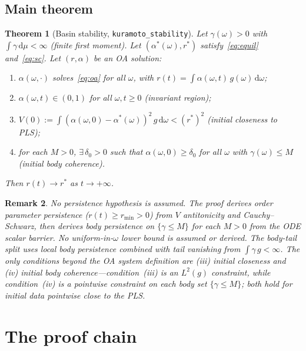 \documentclass[11pt,a4paper]{article}
\newtheorem{theorem}{Theorem}[section]
\newtheorem{remark}[theorem]{Remark}
\theoremstyle{definition}
\begin{document}
\subsection{Main theorem}

\begin{theorem}[Basin stability, \texttt{kuramoto\_stability}]\label{thm:main}
Let $\gamma(\omega) > 0$ with $\int \gamma\,\mathrm{d}\mu < \infty$ (finite first moment). Let $(\alpha^*(\omega), r^*)$ satisfy~\eqref{eq:equil} and~\eqref{eq:sc}. Let $(r, \alpha)$ be an OA solution:
\begin{enumerate}[label=(\roman*)]
\item $\alpha(\omega,\cdot)$ solves~\eqref{eq:oa} for all $\omega$, with $r(t) = \int \alpha(\omega,t)\,g(\omega)\,\mathrm{d}\omega$;
\item $\alpha(\omega,t) \in (0,1)$ for all $\omega, t \geq 0$ (invariant region);
\item $V(0) := \int (\alpha(\omega,0) - \alpha^*(\omega))^2\,g\,\mathrm{d}\omega < (r^*)^2$ (initial closeness to PLS);
\item for each $M > 0$, $\exists\,\delta_0 > 0$ such that $\alpha(\omega,0) \geq \delta_0$ for all $\omega$ with $\gamma(\omega) \leq M$ (initial body coherence).
\end{enumerate}
Then $r(t) \to r^*$ as $t \to +\infty$.
\end{theorem}

\begin{remark}
No persistence hypothesis is assumed. The proof \emph{derives} order parameter persistence ($r(t) \geq r_{\min} > 0$) from $V$ antitonicity and Cauchy--Schwarz, then derives body persistence on $\{\gamma \leq M\}$ for each $M > 0$ from the ODE scalar barrier. No uniform-in-$\omega$ lower bound is assumed or derived. The body-tail split uses local body persistence combined with tail vanishing from $\int \gamma\,g < \infty$. The only conditions beyond the OA system definition are (iii) initial closeness and (iv) initial body coherence---condition~(iii) is an $L^2(g)$ constraint, while condition~(iv) is a pointwise constraint on each body set $\{\gamma \leq M\}$; both hold for initial data pointwise close to the PLS.
\end{remark}

\section{The proof chain}\label{sec:proof}
\end{document}
